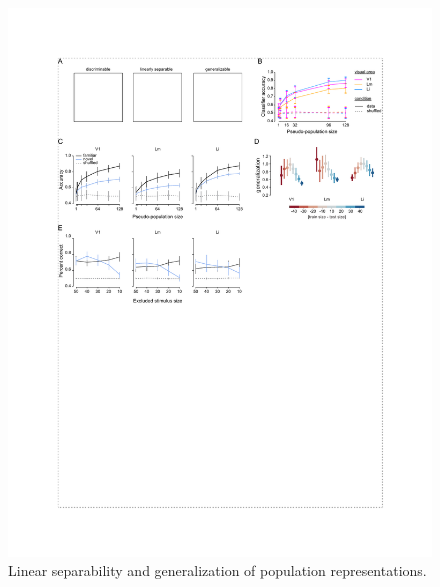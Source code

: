\begin{figure}[t!]
    \includegraphics[width=\textwidth]{figures/chapter_4/fig_4-2_neural_generalization/fig_4-2_neural_generalization.pdf}
    \caption[Population representations of objects]{Linear separability and generalization of population representations. 
}
\end{figure}
